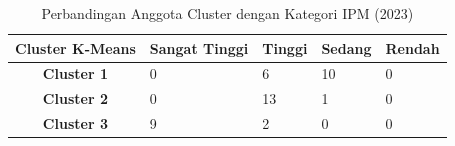 \begin{table}[H]
\centering
\caption{Perbandingan Anggota Cluster dengan Kategori IPM (2023)} \label{tab:ipm_cross_2023}
\begin{tabular}{|c|p{2cm}|p{2cm}|p{2cm}|p{2cm}|}
\hline
\textbf{Cluster K-Means} & \textbf{Sangat Tinggi} & \textbf{Tinggi} & \textbf{Sedang} & \textbf{Rendah} \\ \hline
\textbf{Cluster 1} & 0 & 6 & 10 & 0 \\ \hline
\textbf{Cluster 2} & 0 & 13 & 1 & 0 \\ \hline
\textbf{Cluster 3} & 9 & 2 & 0 & 0 \\ \hline
\end{tabular}
\end{table}